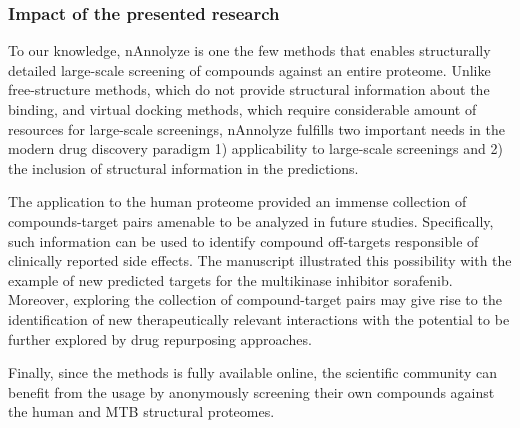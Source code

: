 \documentclass[11pt, b5paper,twoside]{tesi_upf}
\begin{document}
 \subsubsection{Impact of the presented research} 
 
 \par To our knowledge, nAnnolyze is one the few methods that enables structurally detailed large-scale screening of compounds against an entire proteome. Unlike free-structure methods, which do not provide structural information about the binding, and virtual docking methods, which require considerable amount of resources for large-scale screenings, nAnnolyze fulfills two important needs in the modern drug discovery paradigm 1) applicability to large-scale screenings and 2) the inclusion of structural information in the predictions. 
 \par The application to the human proteome provided an immense collection of compounds-target pairs amenable to be analyzed in future studies. Specifically, such information can be used to identify compound off-targets responsible of clinically reported side effects. The manuscript illustrated this possibility with the example of new predicted targets for the multikinase inhibitor sorafenib. Moreover, exploring the collection of compound-target pairs may give rise to the identification of new therapeutically relevant interactions with the potential to be further explored by drug repurposing approaches.  
 \par Finally, since the methods is fully available online, the scientific community can benefit from the usage by anonymously screening their own compounds against the human and MTB structural proteomes.
    
\end{document}
